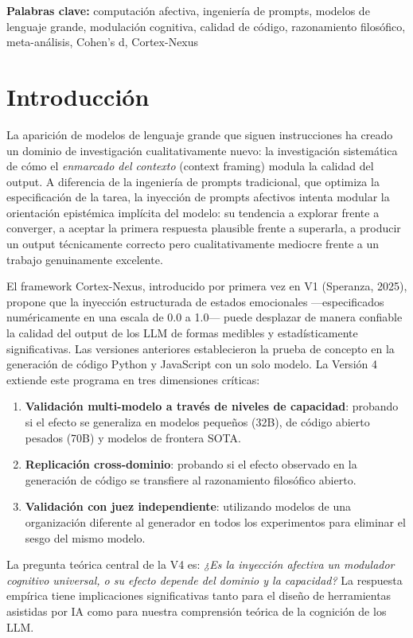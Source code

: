 \documentclass[12pt, a4paper]{article}
\begin{document}
\textbf{Palabras clave:} computación afectiva, ingeniería de prompts, modelos de lenguaje grande, modulación cognitiva, calidad de código, razonamiento filosófico, meta-análisis, Cohen's d, Cortex-Nexus

\newpage

\section{Introducción}

La aparición de modelos de lenguaje grande que siguen instrucciones ha creado un dominio de investigación cualitativamente nuevo: la investigación sistemática de cómo el \textit{enmarcado del contexto} (context framing) modula la calidad del output. A diferencia de la ingeniería de prompts tradicional, que optimiza la especificación de la tarea, la inyección de prompts afectivos intenta modular la orientación epistémica implícita del modelo: su tendencia a explorar frente a converger, a aceptar la primera respuesta plausible frente a superarla, a producir un output técnicamente correcto pero cualitativamente mediocre frente a un trabajo genuinamente excelente.

El framework Cortex-Nexus, introducido por primera vez en V1 (Speranza, 2025), propone que la inyección estructurada de estados emocionales —especificados numéricamente en una escala de 0.0 a 1.0— puede desplazar de manera confiable la calidad del output de los LLM de formas medibles y estadísticamente significativas. Las versiones anteriores establecieron la prueba de concepto en la generación de código Python y JavaScript con un solo modelo. La Versión 4 extiende este programa en tres dimensiones críticas:

\begin{enumerate}
  \item \textbf{Validación multi-modelo a través de niveles de capacidad}: probando si el efecto se generaliza en modelos pequeños (32B), de código abierto pesados (70B) y modelos de frontera SOTA.
  \item \textbf{Replicación cross-dominio}: probando si el efecto observado en la generación de código se transfiere al razonamiento filosófico abierto.
  \item \textbf{Validación con juez independiente}: utilizando modelos de una organización diferente al generador en todos los experimentos para eliminar el sesgo del mismo modelo.
\end{enumerate}

La pregunta teórica central de la V4 es: \textit{¿Es la inyección afectiva un modulador cognitivo universal, o su efecto depende del dominio y la capacidad?} La respuesta empírica tiene implicaciones significativas tanto para el diseño de herramientas asistidas por IA como para nuestra comprensión teórica de la cognición de los LLM.
\end{document}
